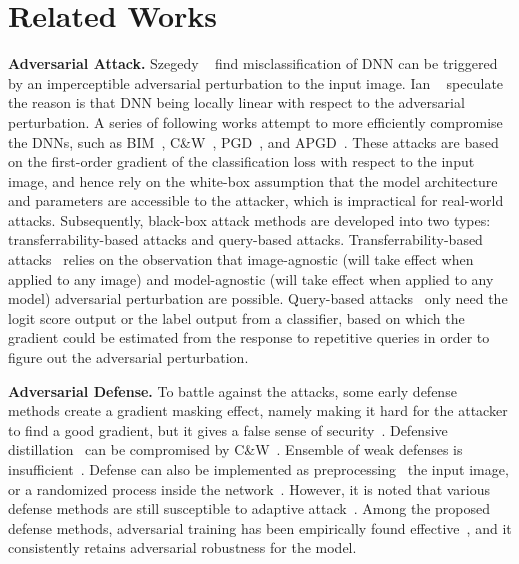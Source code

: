 \documentclass[10pt,twocolumn,letterpaper]{article}
\begin{document}
\section{Related Works}
\label{sec:2}

\textbf{Adversarial Attack.}
%
Szegedy \etal~\cite{l-bfgs} find misclassification of DNN can be triggered by
an imperceptible adversarial perturbation to the input image.
%
Ian \etal~\cite{fgsm} speculate the reason is that DNN being locally linear
with respect to the adversarial perturbation.
%
A series of following works attempt to more efficiently compromise the DNNs,
such as BIM~\cite{i-fgsm}, C\&W~\cite{cw}, PGD~\cite{madry}, and
APGD~\cite{apgd}.
%
These attacks are based on the first-order gradient of the classification loss
with respect to the input image, and hence rely on the white-box assumption
that the model architecture and parameters are accessible to the attacker,
which is impractical for real-world attacks.
%
Subsequently, black-box attack methods are developed into two types:
transferrability-based attacks and query-based attacks.
%
Transferrability-based attacks~\cite{di-fgsm,universal} relies on the
observation that image-agnostic (will take effect when applied to any image)
and model-agnostic (will take effect when applied to any model) adversarial
perturbation are possible.
%
Query-based attacks~\cite{nes-atk,spsa-atk} only need the logit score output or
the label output from a classifier, based on which the gradient could be
estimated from the response to repetitive queries in order to figure out the
adversarial perturbation.

\textbf{Adversarial Defense.}
%
To battle against the attacks, some early defense methods create a gradient
masking effect, namely making it hard for the attacker to find a good gradient,
but it gives a false sense of security~\cite{obfuscated}.
%
Defensive distillation~\cite{distill2} can be compromised by C\&W~\cite{cw}.
%
Ensemble of weak defenses is insufficient~\cite{ensembleweak}.
%
Defense can also be implemented as preprocessing~\cite{deflecting} the input
image, or a randomized process inside the network~\cite{self-ensemble}.
%
However, it is noted that various defense methods are still susceptible to
adaptive attack~\cite{adaptive}.
%
Among the proposed defense methods, adversarial training has been empirically
found effective~\cite{bilateral,advtrain-triplet,benchmarking}, and it
consistently retains adversarial robustness for the model.
\end{document}
